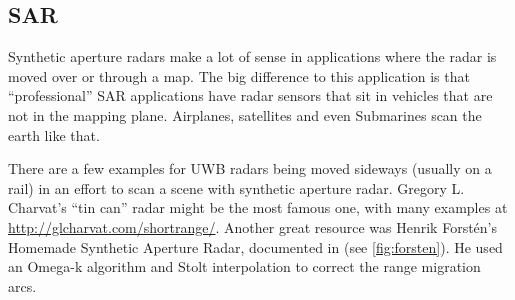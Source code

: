 \subsection{SAR}\label{sar-1}
Synthetic aperture radars make a lot of sense in applications
where the radar is moved over or through a map. The big difference to
this application is that ``professional'' SAR applications have radar
sensors that sit in vehicles that are not in the mapping plane.
Airplanes, satellites and even Submarines scan the earth like that.

There are a few examples for UWB radars being moved sideways (usually on a rail) in an effort to scan a scene with synthetic aperture radar.
Gregory L. Charvat's ``tin can'' radar \cite{Charvat2014} might be the most famous one, with many examples at \url{http://glcharvat.com/shortrange/}.
Another great resource was Henrik Forstén's Homemade Synthetic Aperture
Radar, documented in \cite{Forsten2015} (see \cref{fig:forsten}). He used an Omega-k algorithm \cite{Tolman2008} and Stolt interpolation \cite{Cumming2004} to correct the range migration arcs.

